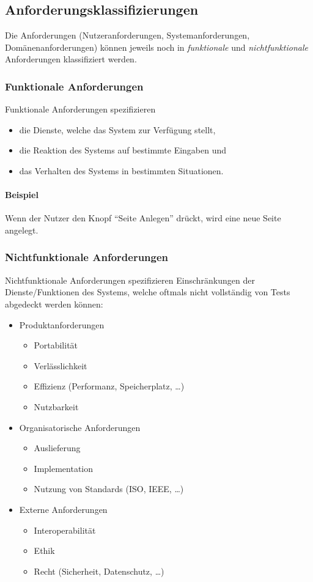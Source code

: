 		\subsection{Anforderungsklassifizierungen}
			Die Anforderungen (Nutzeranforderungen, Systemanforderungen, Domänenanforderungen) können jeweils noch in \textit{funktionale} und \textit{nichtfunktionale} Anforderungen klassifiziert werden.

			\subsubsection{Funktionale Anforderungen}
				Funktionale Anforderungen spezifizieren
				\begin{itemize}
					\item die Dienste, welche das System zur Verfügung stellt,
					\item die Reaktion des Systems auf bestimmte Eingaben und
					\item das Verhalten des Systems in bestimmten Situationen.
				\end{itemize}

				\paragraph{Beispiel}
					Wenn der Nutzer den Knopf \enquote{Seite Anlegen} drückt, wird eine neue Seite angelegt.

			\subsubsection{Nichtfunktionale Anforderungen}
				Nichtfunktionale Anforderungen spezifizieren Einschränkungen der Dienste/Funktionen des Systems, welche oftmals nicht vollständig von Tests abgedeckt werden können:
				\begin{itemize}
					\item Produktanforderungen
						\begin{itemize}
							\item Portabilität
							\item Verlässlichkeit
							\item Effizienz (Performanz, Speicherplatz, \dots)
							\item Nutzbarkeit
						\end{itemize}
					\item Organisatorische Anforderungen
						\begin{itemize}
							\item Auslieferung
							\item Implementation
							\item Nutzung von Standards (ISO, IEEE, \dots)
						\end{itemize}
					\item Externe Anforderungen
						\begin{itemize}
							\item Interoperabilität
							\item Ethik
							\item Recht (Sicherheit, Datenschutz, \dots)
						\end{itemize}
				\end{itemize}

